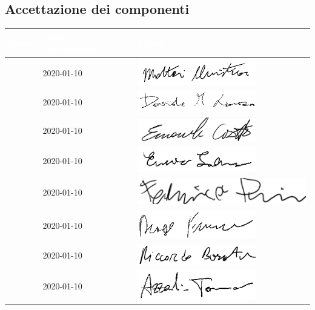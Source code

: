 \subsection{Accettazione dei componenti}
{
	\renewcommand{\arraystretch}{2}
	\begin{longtable}{ C{5cm} C{4cm} C{5cm} }
		\textcolor{white}{\textbf{Nome}} & \textcolor{white}{\textbf{Data di Accettazione}} & \textcolor{white}{\textbf{Firma}}\\	\endhead
		
		
		\MC{} & 2020-01-10 & \includegraphics[scale=0.70]{sezioni/Firme/Christian.png}\\
		\LD{} & 2020-01-10 & \includegraphics[scale=0.60]{sezioni/Firme/Davide.png}\\
		\CE{} & 2020-01-10 & \includegraphics[scale=0.70]{sezioni/Firme/Emanuele.png} \\
		\SE{} & 2020-01-10 & \includegraphics[scale=0.70]{sezioni/Firme/Enrico.png}\\
		\PF{} & 2020-01-10 & \includegraphics[scale=0.50]{sezioni/Firme/Federico.png}\\
		\DF{} & 2020-01-10 & \includegraphics[scale=0.70]{sezioni/Firme/Francesco.png} \\
		\BR{} & 2020-01-10& \includegraphics[scale=0.70]{sezioni/Firme/Riccardo.png} \\
		\AT{} & 2020-01-10 & \includegraphics[scale=0.70]{sezioni/Firme/Tommaso.png} \\
		
		
	\end{longtable}
}

